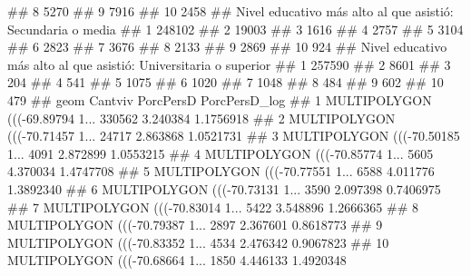 \documentclass[11pt,]{article}
\newenvironment{Shaded}{\begin{snugshade}}{\end{snugshade}}
\newcommand{\StringTok}[1]{\textcolor[rgb]{0.31,0.60,0.02}{#1}}
\begin{document}
\begin{Shaded}
\begin{Highlighting}[]
{{{{\StringTok{## 8                                                        5270}
\StringTok{## 9                                                        7916}
\StringTok{## 10                                                       2458}
\StringTok{##    Nivel educativo más alto al que asistió: Secundaria o media}
\StringTok{## 1                                                       248102}
\StringTok{## 2                                                        19003}
\StringTok{## 3                                                         1616}
\StringTok{## 4                                                         2757}
\StringTok{## 5                                                         3104}
\StringTok{## 6                                                         2823}
\StringTok{## 7                                                         3676}
\StringTok{## 8                                                         2133}
\StringTok{## 9                                                         2869}
\StringTok{## 10                                                         924}
\StringTok{##    Nivel educativo más alto al que asistió: Universitaria o superior}
\StringTok{## 1                                                             257590}
\StringTok{## 2                                                               8601}
\StringTok{## 3                                                                204}
\StringTok{## 4                                                                541}
\StringTok{## 5                                                               1075}
\StringTok{## 6                                                               1020}
\StringTok{## 7                                                               1048}
\StringTok{## 8                                                                484}
\StringTok{## 9                                                                602}
\StringTok{## 10                                                               479}
\StringTok{##                              geom Cantviv PorcPersD PorcPersD_log}
\StringTok{## 1  MULTIPOLYGON (((-69.89794 1...  330562  3.240384     1.1756918}
\StringTok{## 2  MULTIPOLYGON (((-70.71457 1...   24717  2.863868     1.0521731}
\StringTok{## 3  MULTIPOLYGON (((-70.50185 1...    4091  2.872899     1.0553215}
\StringTok{## 4  MULTIPOLYGON (((-70.85774 1...    5605  4.370034     1.4747708}
\StringTok{## 5  MULTIPOLYGON (((-70.77551 1...    6588  4.011776     1.3892340}
\StringTok{## 6  MULTIPOLYGON (((-70.73131 1...    3590  2.097398     0.7406975}
\StringTok{## 7  MULTIPOLYGON (((-70.83014 1...    5422  3.548896     1.2666365}
\StringTok{## 8  MULTIPOLYGON (((-70.79387 1...    2897  2.367601     0.8618773}
\StringTok{## 9  MULTIPOLYGON (((-70.83352 1...    4534  2.476342     0.9067823}
\StringTok{## 10 MULTIPOLYGON (((-70.68664 1...    1850  4.446133     1.4920348}

}}}}
\end{Highlighting}
\end{Shaded}
\end{document}
